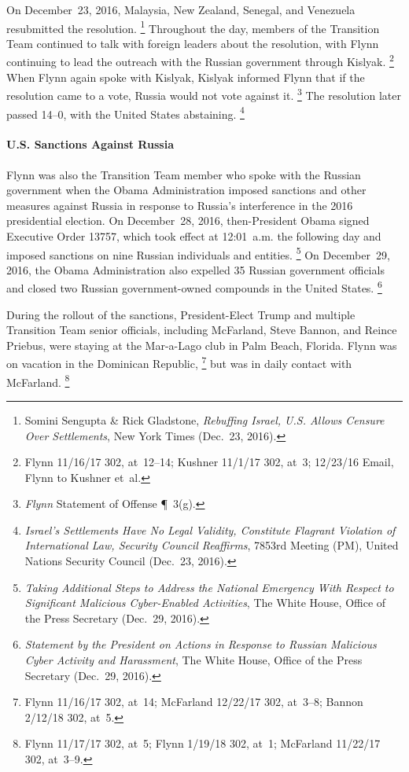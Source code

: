 On December~23, 2016, Malaysia, New Zealand, Senegal, and Venezuela resubmitted the resolution.%
\footnote{Somini Sengupta \& Rick Gladstone, \textit{Rebuffing Israel, U.S. Allows Censure Over Settlements}, New York Times (Dec.~23, 2016).}
Throughout the day, members of the Transition Team continued to talk with foreign leaders about the resolution, with Flynn continuing to lead the outreach with the Russian government through Kislyak.%
\footnote{Flynn 11/16/17 302, at~12--14;
Kushner 11/1/17 302, at~3;
12/23/16 Email, Flynn to Kushner et~al.}
When Flynn again spoke with Kislyak, Kislyak informed Flynn that if the resolution came to a vote, Russia would not vote against it.%
\footnote{\textit{Flynn} Statement of Offense \P~3(g).}
The resolution later passed 14--0, with the United States abstaining.%
\footnote{\textit{Israel's Settlements Have No Legal Validity, Constitute Flagrant Violation of International Law, Security Council Reaffirms}, 7853rd Meeting (PM), United Nations Security Council (Dec.~23, 2016).}

\paragraph{U.S. Sanctions Against Russia}

Flynn was also the Transition Team member who spoke with the Russian government when the Obama Administration imposed sanctions and other measures against Russia in response to Russia's interference in the 2016 presidential election.
On December~28, 2016, then-President Obama signed Executive Order 13757, which took effect at 12:01~a.m. the following day and imposed sanctions on nine Russian individuals and entities.%
\footnote{\textit{Taking Additional Steps to Address the National Emergency With Respect to Significant Malicious Cyber-Enabled Activities}, The White House, Office of the Press Secretary (Dec.~29, 2016).}
On December~29, 2016, the Obama Administration also expelled 35 Russian government officials and closed two Russian government-owned compounds in the United States.%
\footnote{\textit{Statement by the President on Actions in Response to Russian Malicious Cyber Activity and Harassment}, The White House, Office of the Press Secretary (Dec.~29, 2016).}

During the rollout of the sanctions, President-Elect Trump and multiple Transition Team senior officials, including McFarland, Steve Bannon, and Reince Priebus, were staying at the Mar-a-Lago club in Palm Beach, Florida.
Flynn was on vacation in the Dominican Republic,%
\footnote{Flynn 11/16/17 302, at~14;
McFarland 12/22/17 302, at~3--8;
Bannon 2/12/18 302, at~5.}
but was in daily contact with McFarland.%
\footnote{Flynn 11/17/17 302, at~5;
Flynn 1/19/18 302, at~1;
McFarland 11/22/17 302, at~3--9.}

